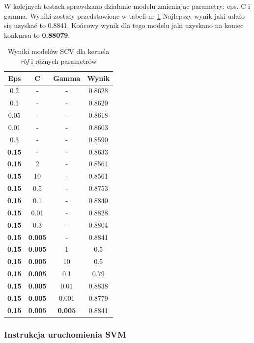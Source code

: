 \documentclass[12pt]{article}
\begin{document}
W kolejnych testach sprawdzano działanie modelu zmieniając parametry: eps, C i gamma. Wyniki zostały przedstawione w tabeli nr \ref{tab:rgf_test} Najlepszy wynik jaki udało się uzyskać to 0.8841. Końcowy wynik dla tego modelu jaki uzyskano na koniec konkursu to \textbf{0.88079}.

\begin{table}[H]
    \centering
    \begin{tabular}{|c|c|c|c|}
    \hline
    Eps & C & Gamma & Wynik \\
    \hline
    \hline
    0.2 & - & - & 0.8628 \\
    \hline
    0.1 & - & - & 0.8629 \\
    \hline
    0.05 & - & - & 0.8618 \\
    \hline
    0.01 & - & - & 0.8603 \\
    \hline
    0.3 & - & - & 0.8590 \\
    \hline
    \textbf{0.15} & - & - & 0.8633 \\
    \hline
    \textbf{0.15} & 2 & - & 0.8564 \\
    \hline
    \textbf{0.15} & 10 & - & 0.8561 \\
    \hline
    \textbf{0.15} & 0.5 & - & 0.8753 \\
    \hline
    \textbf{0.15} & 0.1 & - & 0.8840 \\
    \hline
    \textbf{0.15} & 0.01 & - & 0.8828 \\
    \hline
    \textbf{0.15} & 0.3 & - & 0.8804 \\
    \hline
    \textbf{0.15} & \textbf{0.005} & - & 0.8841 \\
    \hline
    \textbf{0.15} & \textbf{0.005} & 1 & 0.5 \\
    \hline
    \textbf{0.15} & \textbf{0.005} & 10 & 0.5 \\
    \hline
    \textbf{0.15} & \textbf{0.005} & 0.1 & 0.79 \\
    \hline
    \textbf{0.15} & \textbf{0.005} & 0.01 & 0.8838 \\
    \hline
    \textbf{0.15} & \textbf{0.005} & 0.001 & 0.8779 \\
    \hline
    \textbf{0.15} & \textbf{0.005} & \textbf{0.005} & 0.8841 \\
    \hline
    \end{tabular}
    \caption{Wyniki modelów SCV dla kernela \textit{rbf} i różnych parametrów}
    \label{tab:rgf_test}
\end{table}

\subsubsection{Instrukcja uruchomienia SVM}
\end{document}
